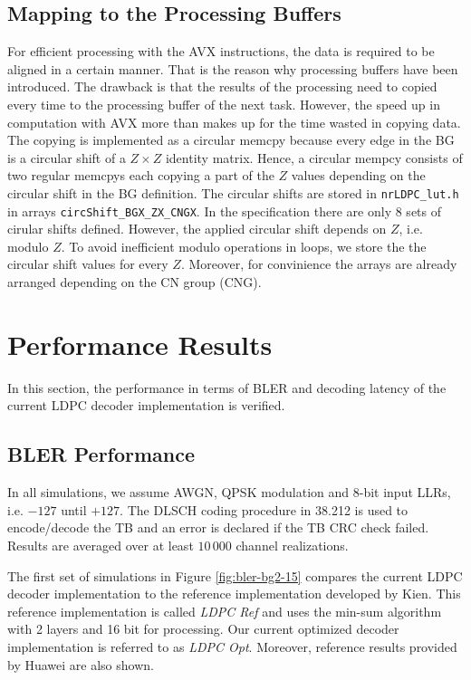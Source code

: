\documentclass{article}
\begin{document}
\subsection{Mapping to the Processing Buffers}
\label{sec:mapp-cn-proc}

For efficient processing with the AVX instructions, the data is required to be aligned in a certain manner. That is the reason why processing buffers have been introduced. The drawback is that the results of the processing need to copied every time to the processing buffer of the next task. However, the speed up in computation with AVX more than makes up for the time wasted in copying data. The copying is implemented as a circular memcpy because every edge in the BG is a circular shift of a $Z\times Z$ identity matrix. Hence, a circular mempcy consists of two regular memcpys each copying a part of the $Z$ values depending on the circular shift in the BG definition. The circular shifts are stored in \texttt{nrLDPC\_lut.h} in arrays \texttt{circShift\_BGX\_ZX\_CNGX}. In the specification there are only 8 sets of cirular shifts defined. However, the applied circular shift depends on $Z$, i.e. modulo $Z$. To avoid inefficient modulo operations in loops, we store the the circular shift values for every $Z$. Moreover, for convinience the arrays are already arranged depending on the CN group (CNG).

\newpage
\section{Performance Results}
\label{sec:performance-results}

In this section, the performance in terms of BLER and decoding latency of the current LDPC decoder implementation is verified.

\subsection{BLER Performance}
\label{sec:bler-performance}

In all simulations, we assume AWGN, QPSK modulation and 8-bit input LLRs, i.e. $-127$ until $+127$. The DLSCH coding procedure in 38.212 is used to encode/decode the TB and an error is declared if the TB CRC check failed. Results are averaged over at least $10\,000$ channel realizations. 

The first set of simulations in Figure \ref{fig:bler-bg2-15} compares the current LDPC decoder implementation to the reference implementation developed by Kien. This reference implementation is called \textit{LDPC Ref} and uses the min-sum algorithm with 2 layers and 16 bit for processing. Our current optimized decoder implementation is referred to as \textit{LDPC Opt}. Moreover, reference results provided by Huawei are also shown.
\end{document}
